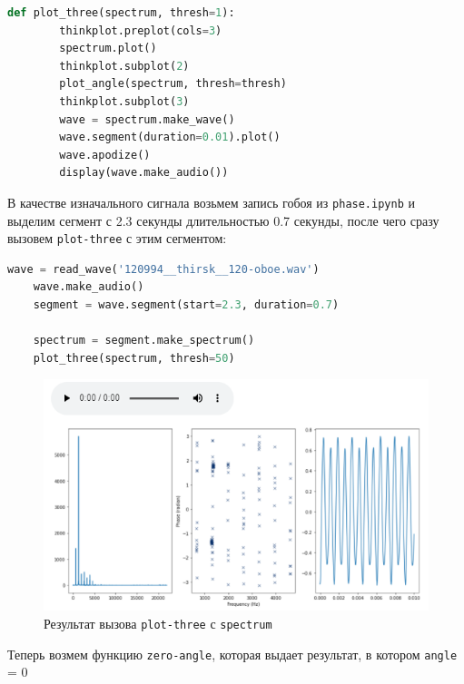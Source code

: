 \documentclass[a4paper]{article}
\begin{document}
\begin{lstlisting}[language=Python, caption= Функция \texttt{plot-three}]
    def plot_three(spectrum, thresh=1):
        thinkplot.preplot(cols=3)
        spectrum.plot()
        thinkplot.subplot(2)
        plot_angle(spectrum, thresh=thresh)
        thinkplot.subplot(3)
        wave = spectrum.make_wave()
        wave.segment(duration=0.01).plot()
        wave.apodize()
        display(wave.make_audio())
\end{lstlisting} 
            
            В качестве изначального сигнала возьмем запись гобоя из \texttt{phase.ipynb} и выделим сегмент с 2.3 секунды длительностью 0.7 секунды, после чего сразу вызовем \texttt{plot-three} с этим сегментом:
            
\begin{lstlisting}[language=Python, caption= Вызов \texttt{plot-three} с \texttt{spectrum}]
    wave = read_wave('120994__thirsk__120-oboe.wav')
    wave.make_audio()
    segment = wave.segment(start=2.3, duration=0.7)
    
    spectrum = segment.make_spectrum()
    plot_three(spectrum, thresh=50)
\end{lstlisting} 
            
            \begin{figure}[H]
                \centering
                \includegraphics[width=\textwidth]{ex_3_spectrum.png}
                \caption{Результат вызова \texttt{plot-three} с \texttt{spectrum}}
                \label{fig:ex_3_spectrum}
            \end{figure}
            
            Теперь возмем функцию \texttt{zero-angle}, которая выдает результат, в котором \texttt{angle} = 0
            
\end{document}
